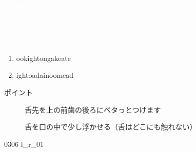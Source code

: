 \documentclass[aspectratio=169, xcolor={dvipsnames,table}]{beamer}
\begin{document}
\begin{frame}
  \centering
  \textcolor{white}{\Huge\bfseries Today's Pronunciation}\pause

  \vspace{30pt}

  \textcolor{white}{\Huge\bfseries {}, }
  \vfill

  \hfill\hyperlink{ex}{}
\end{frame}
\begin{frame}[plain,label=slide_l_r]{\,\,\,}
  \large

  \begin{enumerate}
    \item {}\hspace{20pt}ook\hspace{1\zw}ight\hspace{1\zw}ong\hspace{1\zw}ake\hspace{1\zw}ate

    \item {}\hspace{20pt}ight\hspace{1\zw}oad\hspace{1\zw}ain\hspace{1\zw}oom\hspace{1\zw}ead
  \end{enumerate}

  \vspace*{20pt}

  \normalsize ポイント

  \begin{description}
    \item[] 舌先を上の前歯の後ろにベタっとつけます

    \item[] 舌を口の中で少し浮かせる（舌はどこにも触れない）
  \end{description}
  \hfill{\tiny 0306}\,\,{\tiny l\_r\_01}
\end{frame}
\end{document}
